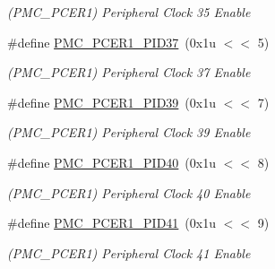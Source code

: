 \begin{DoxyCompactItemize}
\begin{DoxyCompactList}\small\item\em (P\+M\+C\+\_\+\+P\+C\+E\+R1) Peripheral Clock 35 Enable \end{DoxyCompactList}\item 
\mbox{\label{group__SAMS70__PMC_ga583fd8155a9f5bc35ab5b04dd96e80cf}} 
\#define \mbox{\hyperlink{group__SAMS70__PMC_ga583fd8155a9f5bc35ab5b04dd96e80cf}{P\+M\+C\+\_\+\+P\+C\+E\+R1\+\_\+\+P\+I\+D37}}~(0x1u $<$$<$ 5)
\begin{DoxyCompactList}\small\item\em (P\+M\+C\+\_\+\+P\+C\+E\+R1) Peripheral Clock 37 Enable \end{DoxyCompactList}\item 
\mbox{\label{group__SAMS70__PMC_ga1c7216243d711d21942db3dc40e13a37}} 
\#define \mbox{\hyperlink{group__SAMS70__PMC_ga1c7216243d711d21942db3dc40e13a37}{P\+M\+C\+\_\+\+P\+C\+E\+R1\+\_\+\+P\+I\+D39}}~(0x1u $<$$<$ 7)
\begin{DoxyCompactList}\small\item\em (P\+M\+C\+\_\+\+P\+C\+E\+R1) Peripheral Clock 39 Enable \end{DoxyCompactList}\item 
\mbox{\label{group__SAMS70__PMC_gaffc82d0968fe793572be10036edb19ac}} 
\#define \mbox{\hyperlink{group__SAMS70__PMC_gaffc82d0968fe793572be10036edb19ac}{P\+M\+C\+\_\+\+P\+C\+E\+R1\+\_\+\+P\+I\+D40}}~(0x1u $<$$<$ 8)
\begin{DoxyCompactList}\small\item\em (P\+M\+C\+\_\+\+P\+C\+E\+R1) Peripheral Clock 40 Enable \end{DoxyCompactList}\item 
\mbox{\label{group__SAMS70__PMC_ga1fc7447315dc95102828c4e6e1dd8019}} 
\#define \mbox{\hyperlink{group__SAMS70__PMC_ga1fc7447315dc95102828c4e6e1dd8019}{P\+M\+C\+\_\+\+P\+C\+E\+R1\+\_\+\+P\+I\+D41}}~(0x1u $<$$<$ 9)
\begin{DoxyCompactList}\small\item\em (P\+M\+C\+\_\+\+P\+C\+E\+R1) Peripheral Clock 41 Enable \end{DoxyCompactList}\item 
\mbox{\label{group__SAMS70__PMC_ga675b4fb7ad79afa1f77aee029fdf6a8e}} 

\end{DoxyCompactItemize}
